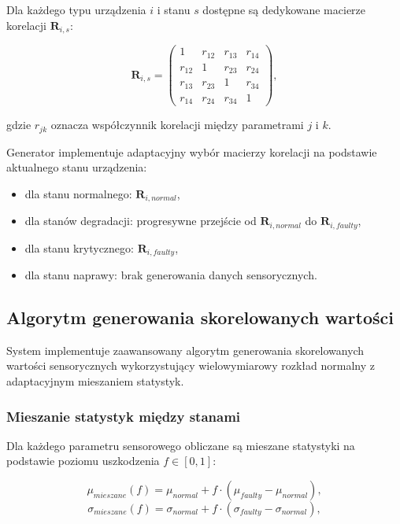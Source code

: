 Dla każdego typu urządzenia $i$ i stanu $s$ dostępne są dedykowane macierze korelacji $\mathbf{R}_{i,s}$:

$$\mathbf{R}_{i,s} = \begin{pmatrix}
1 & r_{12} & r_{13} & r_{14} \\
r_{12} & 1 & r_{23} & r_{24} \\
r_{13} & r_{23} & 1 & r_{34} \\
r_{14} & r_{24} & r_{34} & 1
\end{pmatrix},$$

gdzie $r_{jk}$ oznacza współczynnik korelacji między parametrami $j$ i $k$.

\vspace{0.3em}

Generator implementuje adaptacyjny wybór macierzy korelacji na podstawie aktualnego stanu urządzenia:
\begin{itemize}
    \item dla stanu normalnego: $\mathbf{R}_{i,normal}$,
    \item dla stanów degradacji: progresywne przejście od $\mathbf{R}_{i,normal}$ do $\mathbf{R}_{i,faulty}$,
    \item dla stanu krytycznego: $\mathbf{R}_{i,faulty}$,
    \item dla stanu naprawy: brak generowania danych sensorycznych.
\end{itemize}

\subsection{Algorytm generowania skorelowanych wartości}
\label{subsec:algorytm_generowania}

System implementuje zaawansowany algorytm generowania skorelowanych wartości sensorycznych wykorzystujący wielowymiarowy rozkład normalny z adaptacyjnym mieszaniem statystyk.

\subsubsection{Mieszanie statystyk między stanami}

Dla każdego parametru sensorowego obliczane są mieszane statystyki na podstawie poziomu uszkodzenia $f \in [0, 1]$:

$$\mu_{mieszane}(f) = \mu_{normal} + f \cdot (\mu_{faulty} - \mu_{normal}),$$
$$\sigma_{mieszane}(f) = \sigma_{normal} + f \cdot (\sigma_{faulty} - \sigma_{normal}),$$

